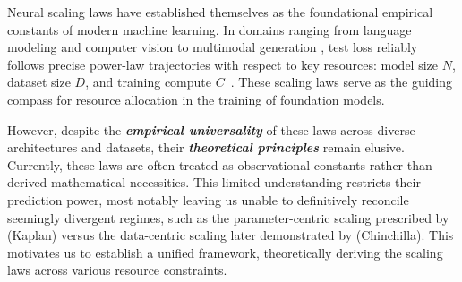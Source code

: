 \documentclass{article}
\theoremstyle{plain}
\theoremstyle{definition}
\theoremstyle{remark}
\begin{document}
Neural scaling laws have established themselves as the foundational empirical constants of modern machine learning. In domains ranging from language modeling \citep{brown2020languagemodelsfewshotlearners, kaplan2020scalinglawsneurallanguage} and computer vision \citep{zhai2022scalingvisiontransformers} to multimodal generation \citep{henighan2020scalinglawsautoregressivegenerative}, test loss reliably follows precise power-law trajectories with respect to key resources: model size $N$, dataset size $D$, and training compute $C$~\citep{hestness2017deeplearningscalingpredictable}. These scaling laws serve as the guiding compass for resource allocation in the training of foundation models.


However, despite the \textbf{\textit{empirical universality}} of these laws across diverse architectures and datasets, their \textbf{\textit{theoretical principles}} remain elusive. 
Currently, these laws are often treated as observational constants rather than derived mathematical necessities.
This limited understanding restricts their prediction power, most notably leaving us unable to definitively reconcile seemingly divergent regimes, such as the parameter-centric scaling prescribed by \citet{kaplan2020scalinglawsneurallanguage} (Kaplan) versus the data-centric scaling later demonstrated by \citet{hoffmann2022trainingcomputeoptimallargelanguage} (Chinchilla).
This motivates us to establish a unified framework, theoretically deriving the scaling laws across various resource constraints.



\end{document}
